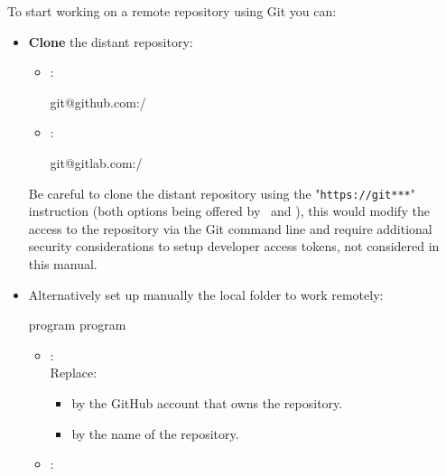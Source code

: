 To start working on a remote repository using Git you can:
\begin{itemize}
\item {\bf{Clone}} the distant repository:
\begin{itemize}
\item \github:
{\footnotesize{
\begin{scriptii}
  git@github.com:/
\end{scriptii}
}}
\item \gitlab:
{\footnotesize{
\begin{scriptii}
  git@gitlab.com:/
\end{scriptii}
}}
\end{itemize}
\noindent Be careful  to clone the distant repository using the "\texttt{https://git***}" instruction 
(both options being offered by \github\ and \gitlab), 
this would modify the access to the repository via the Git command line and require additional security considerations to setup 
developer access tokens, not considered in this manual. 
\item Alternatively set up manually the local folder to work remotely:
{\footnotesize{
\begin{scripti}
\fprompt{~}  program
\fprompt{~}  program
 
\end{scripti}
}}
\begin{itemize}
\vspace{-0.5cm}
\item \github:
{}
\\[-0.75cm]
\noindent Replace:
\begin{itemize}
\item {}\quad by the GitHub account that owns the repository.
\item {}\quad by the name of the repository. \\
\end{itemize}
\item \gitlab:
{}
\end{itemize}
\end{itemize}
